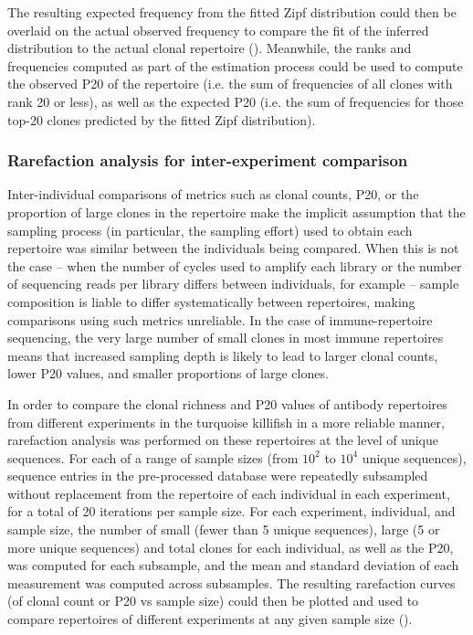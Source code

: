 \noindent The resulting expected frequency from the fitted Zipf distribution could then be overlaid on the actual observed frequency to compare the fit of the inferred distribution to the actual clonal repertoire (). Meanwhile, the ranks and frequencies computed as part of the estimation process could be used to compute the observed P20 of the repertoire (i.e. the sum of frequencies of all clones with rank 20 or less), as well as the expected P20 (i.e. the sum of frequencies for those top-20 clones predicted by the fitted Zipf distribution).


\subsubsection{Rarefaction analysis for inter-experiment comparison}
\label{sec:methods_comp_igdownstream_rarefaction}

Inter-individual comparisons of metrics such as clonal counts, P20, or the proportion of large clones in the repertoire make the implicit assumption that the sampling process (in particular, the sampling effort) used to obtain each repertoire was similar between the individuals being compared. When this is not the case -- when the number of cycles used to amplify each library or the number of sequencing reads per library differs between individuals, for example -- sample composition is liable to differ systematically between repertoires, making comparisons using such metrics unreliable. In the case of immune-repertoire sequencing, the very large number of small clones in most immune repertoires \parencite{mora2016diversity} means that increased sampling depth is likely to lead to larger clonal counts, lower P20 values, and smaller proportions of large clones.

In order to compare the clonal richness and P20 values of antibody repertoires from different \igseq experiments in the turquoise killifish in a more reliable manner, rarefaction analysis \parencite{gotelli2001rarefaction} was performed on these repertoires at the level of unique sequences. For each of a range of sample sizes (from $10^2$ to $10^4$ unique sequences), sequence entries in the pre-processed  database were repeatedly subsampled without replacement from the repertoire of each individual in each experiment, for a total of 20 iterations per sample size. For each experiment, individual, and sample size, the number of small (fewer than 5 unique sequences), large (5 or more unique sequences) and total clones for each individual, as well as the P20, was computed for each subsample, and the mean and standard deviation of each measurement was computed across subsamples. The resulting rarefaction curves (of clonal count or P20 vs sample size) could then be plotted and used to compare repertoires of different experiments at any given sample size ().

